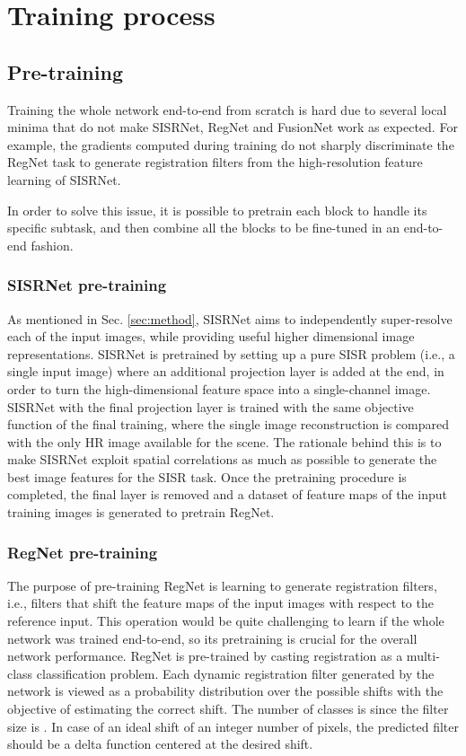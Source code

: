 \documentclass[journal]{IEEEtran}
\begin{document}
\section{Training process}
\label{sec:training}
\subsection{Pre-training}
Training the whole network end-to-end from scratch is hard due to several local minima that do not make SISRNet, RegNet and FusionNet work as expected. For example, the gradients computed during training do not sharply discriminate the RegNet task to generate registration filters from the high-resolution feature learning of SISRNet. 

In order to solve this issue, it is possible to pretrain each block to handle its specific subtask, and then combine all the blocks to be fine-tuned in an end-to-end fashion.

\subsubsection{SISRNet pre-training}

As mentioned in Sec. \ref{sec:method}, SISRNet aims to independently super-resolve each of the  input images, while providing useful higher dimensional image representations. SISRNet is pretrained by setting up a pure SISR problem (i.e., a single input image) where an additional projection layer is added at the end, in order to turn the high-dimensional feature space into a single-channel image. SISRNet with the final projection layer is trained with the same objective function of the final training, where the single image reconstruction is compared with the only HR image available for the scene.
The rationale behind this is to make SISRNet exploit spatial correlations as much as possible to generate the best image features for the SISR task. 
Once the pretraining procedure is completed, the final layer is removed and a dataset of feature maps of the input training images is generated to pretrain RegNet. 

\subsubsection{RegNet pre-training}

The purpose of pre-training RegNet is learning to generate registration filters, i.e., filters that shift the feature maps of the  input images with respect to the reference input. This operation would be quite challenging to learn if the whole network was trained end-to-end, so its pretraining is crucial for the overall network performance.
RegNet is pre-trained by casting registration as a multi-class classification problem. Each dynamic registration filter generated by the network is viewed as a probability distribution over the possible shifts with the objective of estimating the correct shift. The number of classes is  since the filter size is . In case of an ideal shift of an integer number of pixels, the predicted filter should be a delta function centered at the desired shift.
\end{document}
